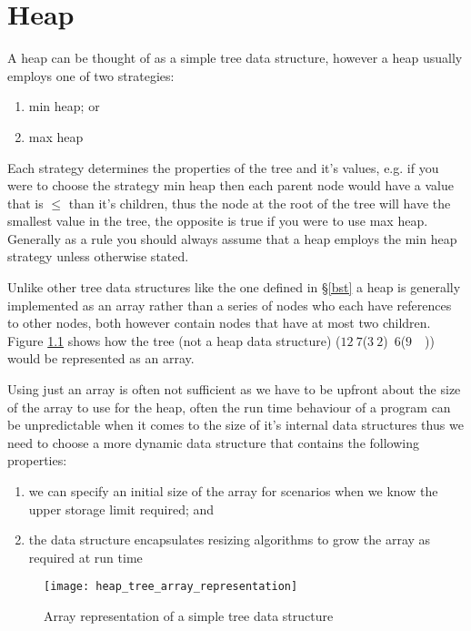 \chapter{Heap}
A heap can be thought of as a simple tree data structure, however a heap usually employs one of two strategies:

\begin{enumerate}
\item min heap; or
\item max heap
\end{enumerate}

Each strategy determines the properties of the tree and it's values, e.g. if you were to choose the strategy min heap then each parent node would have a value that is $\leq$ than it's children, thus the node at the root of the tree will have the smallest value in the tree, the opposite is true if you were to use max heap. Generally as a rule you should always assume that a heap employs the min heap strategy unless otherwise stated.

Unlike other tree data structures like the one defined in \S\ref{bst} a heap is generally implemented as an array rather than a series of nodes who each have references to other nodes, both however contain nodes that have at most two children. Figure \ref{fig:tree_array_representation} shows how the tree (not a heap data structure) ($12~7$($3~2$)~$6$($9$~~)) would be represented as an array.

Using just an array is often not sufficient as we have to be upfront about the size of the array to use for the heap, often the run time behaviour of a program can be unpredictable when it comes to the size of it's internal data structures thus we need to choose a more dynamic data structure that contains the following properties:

\begin{enumerate}
\item we can specify an initial size of the array for scenarios when we know the upper storage limit required; and
\item the data structure encapsulates resizing algorithms to grow the array as required at run time
\end{enumerate}

\begin{figure}
\begin{center}
\texttt{[image: heap\_tree\_array\_representation]}
\end{center}
\caption{Array representation of a simple tree data structure} \label{fig:tree_array_representation}
\end{figure}

